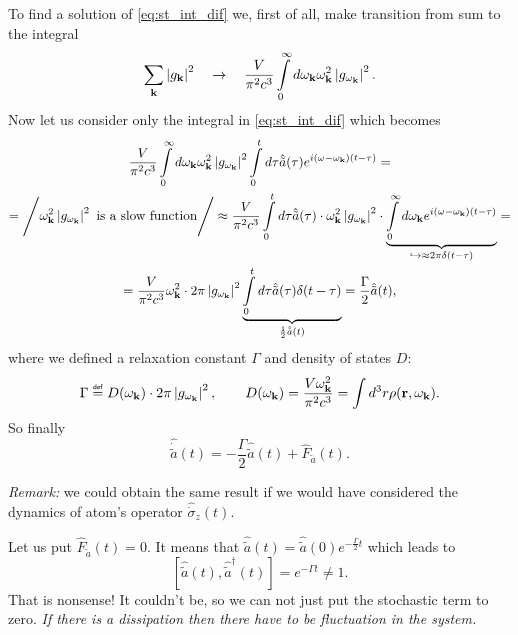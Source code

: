 To find a solution of \eqref{eq:st_int_dif} we, first of all, make transition from sum to the integral
\begin{equation}
	\sum_{\mathbf{k}} \left| g_{\mathbf{k}} \right|^2 \quad \to \quad \frac{V}{\pi^2 c^3} \int \limits_0^{\infty} d \omega_{\mathbf{k}} \omega_{\mathbf{k}}^2 \left| g_{\omega_{\mathbf{k}}} \right|^2.
\end{equation}
Now let us consider only the integral in \eqref{eq:st_int_dif} which becomes
\begin{multline}
	\frac{V}{\pi^2 c^3} \int \limits_0^{\infty} d \omega_{\mathbf{k}} \omega_{\mathbf{k}}^2 \left| g_{\omega_{\mathbf{k}}} \right|^2 \int \limits_0^t d\tau \hat{\tilde{a}}(\tau)e^{i(\omega - \omega_{\mathbf{k}})(t - \tau)} = \\ =\Bigg/ \omega_{\mathbf{k}}^2 \left| g_{\omega_{\mathbf{k}}} \right|^2 \text{ is a slow function} \Bigg/
	\approx \frac{V}{\pi^2 c^3} \int \limits_0^t d \tau \hat{\tilde{a}}(\tau) \cdot \omega_{\mathbf{k}}^2 \left| g_{\omega_{\mathbf{k}}} \right|^2 \cdot  \underbrace{\int \limits_0^{\infty} d \omega_{\mathbf{k}} e^{i(\omega - \omega_{\mathbf{k}})(t - \tau)}}_{\hookrightarrow\approx 2\pi \delta(t - \tau)} =\\= \frac{V}{\pi^2 c^3} \omega_{\mathbf{k}}^2 \cdot 2 \pi \left| g_{\omega_{\mathbf{k}}} \right|^2 \underbrace{\int \limits_0^t d\tau \hat{\tilde{a}}(\tau) \delta(t - \tau)}_{\frac{1}{2} \hat{\tilde{a}}(t)}  =\frac{\Gamma}{2}\hat{\tilde{a}}(t),
\end{multline}
where we defined a relaxation constant $\Gamma$ and density of states $D$:
\begin{equation}
	\Gamma \myeq D(\omega_{\kv}) \cdot 2 \pi \left| g_{\omega_{\kv}} \right|^2  , \qquad D(\omega_{\kv}) = \frac{V \omega_{\kv}^2}{\pi^2 c^3} = \int d^3 r \rho(\vec{r}, \omega_{\kv}).
\end{equation}
So finally 
\begin{equation}
	\boxed{\hat{\dot{\tilde{a}}}(t) = - \frac{\Gamma}{2} \hat{\tilde{a}}(t) + \hat{F}_{\tilde{a}} (t). }
\end{equation}

\textit{Remark:} we could obtain the same result if we would have considered the dynamics of atom's operator $\hat{\dot{\sigma}}_z(t)$.

\begin{testexample}
	Let us put $\hat{F}_{\tilde{a}} (t) = 0$. It means that $\hat{\tilde{a}}(t) = \hat{\tilde{a}}(0) e^{- \frac{\Gamma}{2} t}$ which leads to
	\begin{equation}
		\left[ \hat{\tilde{a}}(t), \hat{\tilde{a}}^{\dagger}(t) \right] = e^{- \Gamma t} \neq 1.
	\end{equation}
	That is nonsense! It couldn’t be, so we can not just put the stochastic term to zero. \textit{If there is a dissipation then there have to be fluctuation in the system.}
\end{testexample}


